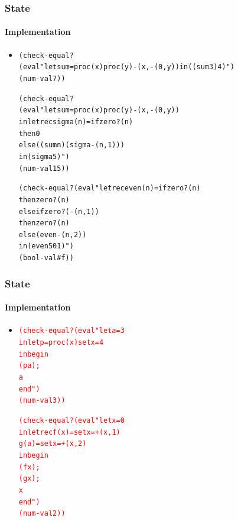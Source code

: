 \documentclass{beamer}
\begin{document}
\begin{frame}[fragile]
\frametitle{State}
\framesubtitle{Implementation}
\begin{scriptsize}
\begin{itemize}
\item<1->
\begin{alltt}
(check-equal?
  (eval "let sum = proc (x) proc (y) -(x, -(0, y)) in ((sum 3) 4)")
  (num-val 7))

(check-equal?
  (eval "let sum = proc (x) proc (y) -(x, -(0, y))
         in letrec sigma (n) = if zero?(n)
                               then 0
                               else ((sum n) (sigma -(n, 1)))
            in (sigma 5)")
  (num-val 15))

(check-equal? (eval "letrec even(n) = if zero?(n)
                                      then zero?(n)
                                      else if zero?(-(n, 1))
                                           then zero?(n)
                                           else (even -(n, 2))
                     in (even 501)")
              (bool-val \#f))
\end{alltt}

\end{itemize}
\end{scriptsize}
\end{frame}

\begin{frame}[fragile]
\frametitle{State}
\framesubtitle{Implementation}
\begin{scriptsize}
\begin{itemize}
\item<1->
\begin{alltt}
\textcolor{red}{(check-equal? (eval "let a = 3
                     in let p = proc (x) set x = 4
                        in begin
                             (p a);
                             a
                           end")
              (num-val 3))}

\textcolor{red}{(check-equal? (eval "let x = 0
                     in letrec f (x) = set x = +(x, 1)
                               g (a) = set x = +(x, 2)
                        in begin
                             (f x);
                             (g x);
                             x
                           end")
              (num-val 2))}
\end{alltt}

\end{itemize}
\end{scriptsize}
\end{frame}
\end{document}
